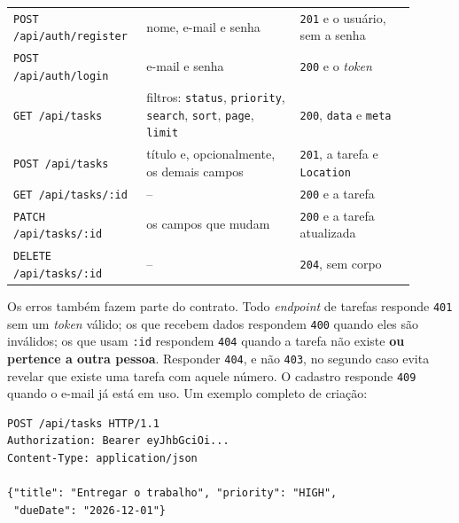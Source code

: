 \begin{center}
\begin{tabular}{@{}P{0.27\linewidth}P{0.36\linewidth}P{0.27\linewidth}@{}}
\toprule
{}
 &  &  \\
\midrule
\texttt{POST /api/auth/register} & nome, e-mail e senha & \texttt{201} e o usuário, sem a senha \\
 \texttt{POST /api/auth/login} & e-mail e senha & \texttt{200} e o \textit{token} \\
\texttt{GET /api/tasks} & filtros: \texttt{status}, \texttt{priority}, \texttt{search}, \texttt{sort}, \texttt{page}, \texttt{limit} & \texttt{200}, \texttt{data} e \texttt{meta} \\
 \texttt{POST /api/tasks} & título e, opcionalmente, os demais campos & \texttt{201}, a tarefa e \texttt{Location} \\
\texttt{GET /api/tasks/:id} & -- & \texttt{200} e a tarefa \\
 \texttt{PATCH /api/tasks/:id} & os campos que mudam & \texttt{200} e a tarefa atualizada \\
\texttt{DELETE /api/tasks/:id} & -- & \texttt{204}, sem corpo \\
\bottomrule
\end{tabular}
\end{center}

Os erros também fazem parte do contrato. Todo \textit{endpoint} de tarefas responde \texttt{401} sem um \textit{token} válido; os que recebem dados respondem \texttt{400} quando eles são inválidos; os que usam \texttt{:id} respondem \texttt{404} quando a tarefa não existe \textbf{ou pertence a outra pessoa}. Responder \texttt{404}, e não \texttt{403}, no segundo caso evita revelar que existe uma tarefa com aquele número. O cadastro responde \texttt{409} quando o e-mail já está em uso. Um exemplo completo de criação:

\begin{codigo}
\begin{Verbatim}[breaklines=true, breaksymbolleft={}, fontsize=\footnotesize]
POST /api/tasks HTTP/1.1
Authorization: Bearer eyJhbGciOi...
Content-Type: application/json

{"title": "Entregar o trabalho", "priority": "HIGH",
 "dueDate": "2026-12-01"}
\end{Verbatim}
\end{codigo}

